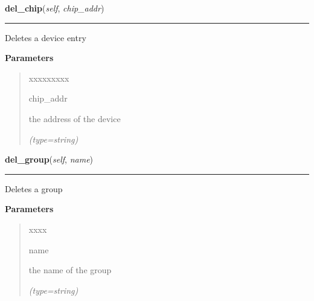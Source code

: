 \hspace{.8\funcindent}\begin{boxedminipage}{\funcwidth}

    \raggedright \textbf{del\_chip}(\textit{self}, \textit{chip\_addr})

    \vspace{-1.5ex}

    \rule{\textwidth}{0.5\fboxrule}
\setlength{\parskip}{2ex}
    Deletes a device entry

\setlength{\parskip}{1ex}
      \textbf{Parameters}
      \vspace{-1ex}

      \begin{quote}
        \begin{Ventry}{xxxxxxxxx}

          \item[chip\_addr]

          the address of the device

            {\it (type=string)}

        \end{Ventry}

      \end{quote}

    \end{boxedminipage}

    \label{DBE:DBE:del_group}

    \vspace{0.5ex}

\hspace{.8\funcindent}\begin{boxedminipage}{\funcwidth}

    \raggedright \textbf{del\_group}(\textit{self}, \textit{name})

    \vspace{-1.5ex}

    \rule{\textwidth}{0.5\fboxrule}
\setlength{\parskip}{2ex}
    Deletes a group

\setlength{\parskip}{1ex}
      \textbf{Parameters}
      \vspace{-1ex}

      \begin{quote}
        \begin{Ventry}{xxxx}

          \item[name]

          the name of the group

            {\it (type=string)}

        \end{Ventry}

      \end{quote}

    \end{boxedminipage}

